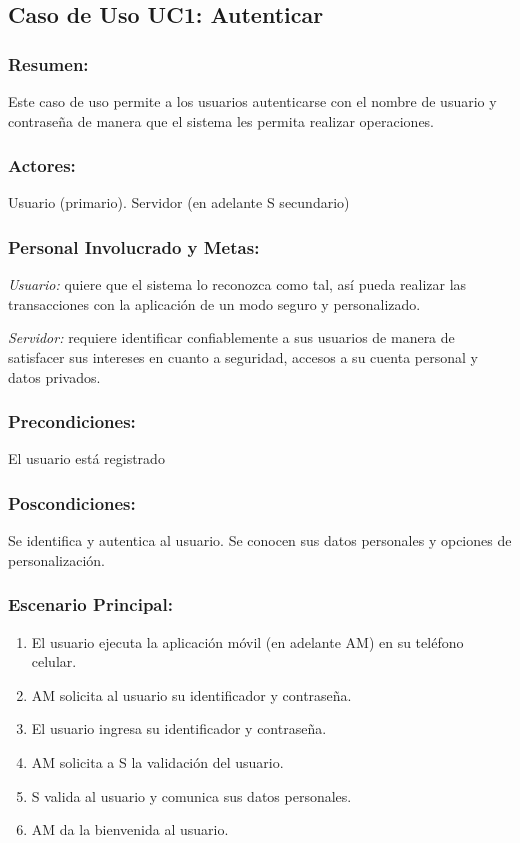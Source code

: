 \subsection{Caso de Uso UC1: Autenticar}

\begin{framed}


\subsubsection{Resumen:} Este caso de uso permite a los usuarios autenticarse con el nombre de usuario y contraseña de manera que el sistema les permita realizar operaciones.


\subsubsection{Actores:} Usuario (primario). Servidor (en adelante S secundario)

\subsubsection{Personal Involucrado y Metas:}

\emph{Usuario:} quiere que el sistema lo reconozca como tal, así pueda realizar las transacciones con la aplicación de un modo seguro y personalizado.

\emph{Servidor:} requiere identificar confiablemente a sus usuarios de manera de satisfacer sus intereses en cuanto a seguridad, accesos a su cuenta personal y datos privados. 

\subsubsection{Precondiciones:} 
El usuario está registrado 

\subsubsection{Poscondiciones:} 
Se identifica y autentica al usuario. Se conocen sus datos personales y opciones de personalización.

\subsubsection{Escenario Principal: }

\begin{enumerate}
    \item El usuario ejecuta la aplicación móvil (en adelante AM) en su teléfono celular. 
    \item AM solicita al usuario su identificador y contraseña. 
    \item El usuario ingresa su identificador y contraseña. 
    \item AM solicita a S la validación del usuario. 
    \item S valida al usuario y comunica sus datos personales. 
    \item AM da la bienvenida al usuario. 
\end{enumerate}


\end{framed}
